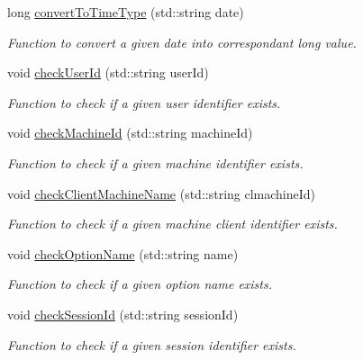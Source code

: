 \begin{DoxyCompactItemize}
long \hyperlink{classQueryServer_af7d3974b4a4c06e7dc92809cb37f5027}{convertToTimeType} (std::string date)
\begin{DoxyCompactList}\small\item\em Function to convert a given date into correspondant long value. \item\end{DoxyCompactList}\item 
void \hyperlink{classQueryServer_a0f5faaf9f4be79361b2eb15e14480a7d}{checkUserId} (std::string userId)
\begin{DoxyCompactList}\small\item\em Function to check if a given user identifier exists. \item\end{DoxyCompactList}\item 
void \hyperlink{classQueryServer_a192112eecd3ec9c706c472d45f82b549}{checkMachineId} (std::string machineId)
\begin{DoxyCompactList}\small\item\em Function to check if a given machine identifier exists. \item\end{DoxyCompactList}\item 
void \hyperlink{classQueryServer_ab05f1d7e54ec0e7bc51772300a7fe9c2}{checkClientMachineName} (std::string clmachineId)
\begin{DoxyCompactList}\small\item\em Function to check if a given machine client identifier exists. \item\end{DoxyCompactList}\item 
void \hyperlink{classQueryServer_addd5852b7271e319daa09c989f23ce83}{checkOptionName} (std::string name)
\begin{DoxyCompactList}\small\item\em Function to check if a given option name exists. \item\end{DoxyCompactList}\item 
void \hyperlink{classQueryServer_aab30c247fe7f71f28ef30d28d78b23e2}{checkSessionId} (std::string sessionId)
\begin{DoxyCompactList}\small\item\em Function to check if a given session identifier exists. \item\end{DoxyCompactList}\item 

\end{DoxyCompactItemize}
